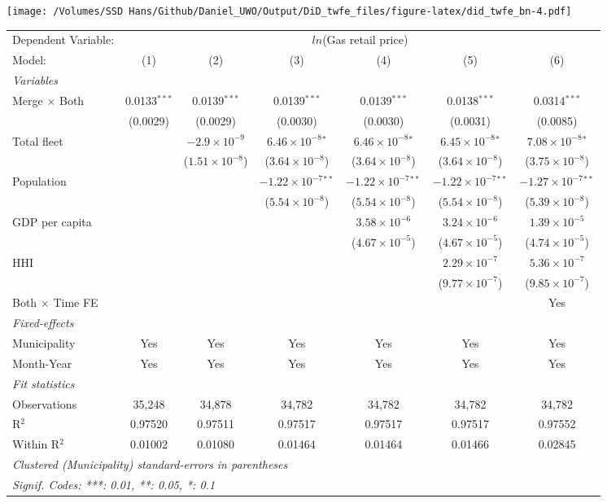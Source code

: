 \documentclass[
]{article}
\begin{document}
\texttt{[image: /Volumes/SSD Hans/Github/Daniel\_UWO/Output/DiD\_twfe\_files/figure-latex/did\_twfe\_bn-4.pdf]}

\begin{tabular}{lcccccc}
\tabularnewline\midrule\midrule
Dependent Variable:&\multicolumn{6}{c}{$ln$(Gas retail price)}\\
Model:&(1) & (2) & (3) & (4) & (5) & (6)\\
\midrule \emph{Variables}&   &   &   &   &   &  \\
Merge $\times $ Both & 0.0133$^{***}$ & 0.0139$^{***}$ & 0.0139$^{***}$ & 0.0139$^{***}$ & 0.0138$^{***}$ & 0.0314$^{***}$\\
  &(0.0029) & (0.0029) & (0.0030) & (0.0030) & (0.0031) & (0.0085)\\
Total fleet &    & $-2.9\times 10^{-9}$ & $6.46\times 10^{-8}$$^{*}$ & $6.46\times 10^{-8}$$^{*}$ & $6.45\times 10^{-8}$$^{*}$ & $7.08\times 10^{-8}$$^{*}$\\
  &   & ($1.51\times 10^{-8}$) & ($3.64\times 10^{-8}$) & ($3.64\times 10^{-8}$) & ($3.64\times 10^{-8}$) & ($3.75\times 10^{-8}$)\\
Population &    &    & $-1.22\times 10^{-7}$$^{**}$ & $-1.22\times 10^{-7}$$^{**}$ & $-1.22\times 10^{-7}$$^{**}$ & $-1.27\times 10^{-7}$$^{**}$\\
  &   &    & ($5.54\times 10^{-8}$) & ($5.54\times 10^{-8}$) & ($5.54\times 10^{-8}$) & ($5.39\times 10^{-8}$)\\
GDP per capita &    &    &    & $3.58\times 10^{-6}$ & $3.24\times 10^{-6}$ & $1.39\times 10^{-5}$\\
  &   &    &    & ($4.67\times 10^{-5}$) & ($4.67\times 10^{-5}$) & ($4.74\times 10^{-5}$)\\
HHI &    &    &    &    & $2.29\times 10^{-7}$ & $5.36\times 10^{-7}$\\
  &   &    &    &    & ($9.77\times 10^{-7}$) & ($9.85\times 10^{-7}$)\\
Both $\times$ Time FE &  &  &  &  &  & Yes\\
\midrule \emph{Fixed-effects}&   &   &   &   &   &  \\
Municipality & Yes & Yes & Yes & Yes & Yes & Yes\\
Month-Year & Yes & Yes & Yes & Yes & Yes & Yes\\
\midrule \emph{Fit statistics}&  & & & & & \\
Observations & 35,248&34,878&34,782&34,782&34,782&34,782\\
R$^2$ & 0.97520&0.97511&0.97517&0.97517&0.97517&0.97552\\
Within R$^2$ & 0.01002&0.01080&0.01464&0.01464&0.01466&0.02845\\
\midrule\midrule\multicolumn{7}{l}{\emph{Clustered (Municipality) standard-errors in parentheses}}\\
\multicolumn{7}{l}{\emph{Signif. Codes: ***: 0.01, **: 0.05, *: 0.1}}\\
\end{tabular}
\end{document}
